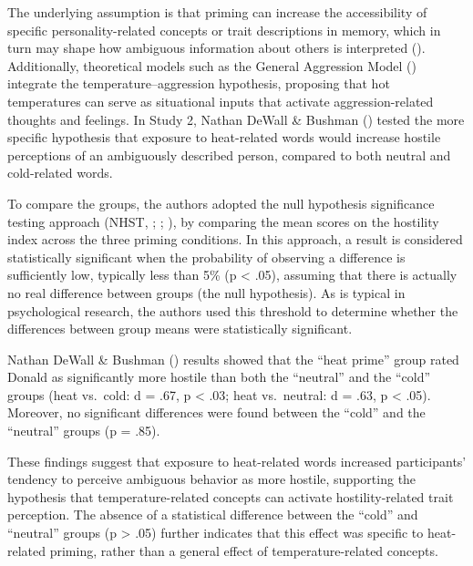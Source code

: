 \documentclass[
  letterpaper,
]{book}
\begin{document}
The underlying assumption is that priming can increase the accessibility
of specific personality-related concepts or trait descriptions in
memory, which in turn may shape how ambiguous information about others
is interpreted ().
Additionally, theoretical models such as the General Aggression Model
()
integrate the temperature--aggression hypothesis, proposing that hot
temperatures can serve as situational inputs that activate
aggression-related thoughts and feelings. In Study 2, Nathan DeWall \&
Bushman () tested the more
specific hypothesis that exposure to heat-related words would increase
hostile perceptions of an ambiguously described person, compared to both
neutral and cold-related words.

To compare the groups, the authors adopted the null hypothesis
significance testing approach (NHST,
;
;
), by
comparing the mean scores on the hostility index across the three
priming conditions. In this approach, a result is considered
statistically significant when the probability of observing a difference
is sufficiently low, typically less than 5\% (p \textless{} .05),
assuming that there is actually no real difference between groups (the
null hypothesis). As is typical in psychological research, the authors
used this threshold to determine whether the differences between group
means were statistically significant.

Nathan DeWall \& Bushman ()
results showed that the ``heat prime'' group rated Donald as
significantly more hostile than both the ``neutral'' and the ``cold''
groups (heat vs.~cold: d = .67, p \textless{} .03; heat vs.~neutral: d =
.63, p \textless{} .05). Moreover, no significant differences were found
between the ``cold'' and the ``neutral'' groups (p = .85).

These findings suggest that exposure to heat-related words increased
participants' tendency to perceive ambiguous behavior as more hostile,
supporting the hypothesis that temperature-related concepts can activate
hostility-related trait perception. The absence of a statistical
difference between the ``cold'' and ``neutral'' groups (p \textgreater{}
.05) further indicates that this effect was specific to heat-related
priming, rather than a general effect of temperature-related concepts.
\end{document}
